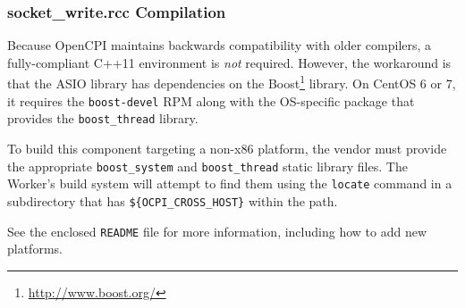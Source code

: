 \documentclass{article}
\def\comp{socket\_write}
\begin{document}
\subsubsection*{\comp.rcc Compilation}
Because OpenCPI maintains backwards compatibility with older compilers, a fully-compliant C++11 environment is \textit{not} required. However, the workaround is that the ASIO library has dependencies on the Boost\footnote{\url{http://www.boost.org/}} library. On CentOS 6 or 7, it requires the \verb+boost-devel+ RPM along with the OS-specific package that provides the \verb+boost_thread+ library.\medskip

To build this component targeting a non-x86 platform, the vendor must provide the appropriate \verb+boost_system+ and \verb+boost_thread+ static library files. The Worker's build system will attempt to find them using the \verb+locate+ command in a subdirectory that has \verb+${OCPI_CROSS_HOST}+ within the path.\medskip

See the enclosed \verb+README+ file for more information, including how to add new platforms.
\end{document}
